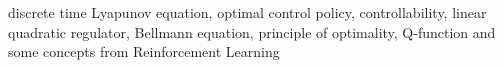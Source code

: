 discrete time Lyapunov equation, optimal control policy, controllability, linear quadratic regulator, Bellmann equation, principle of optimality, Q-function and some concepts from Reinforcement Learning